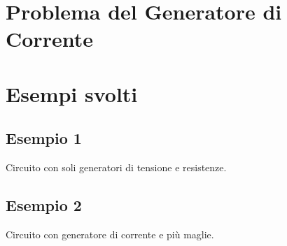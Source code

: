 \section{Problema del Generatore di Corrente}

\section{Esempi svolti}

\subsection{Esempio 1}
Circuito con soli generatori di tensione e resistenze.

\subsection{Esempio 2}
Circuito con generatore di corrente e più maglie.

